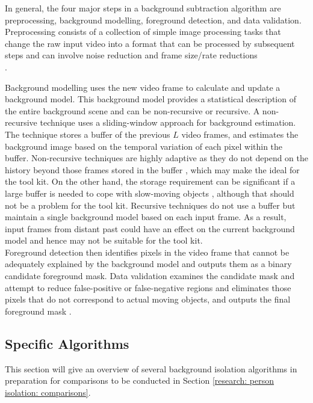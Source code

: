 In general, the four major steps in a background subtraction algorithm are preprocessing, background modelling, foreground detection, and data validation.
Preprocessing consists of a collection of simple image processing tasks that change the raw input video into a format that can be processed by subsequent steps and can involve noise reduction and frame size/rate reductions \cite{Cheung2007}\\.

Background modelling uses the new video frame to calculate and update a background model.
This background model provides a statistical description of the entire background scene and can be non-recursive or recursive. 
A non-recursive technique uses a sliding-window approach for background estimation. 
The technique stores a buffer of the previous $L$ video frames, and estimates the background image based on the temporal variation of each pixel within the buffer.
Non-recursive techniques are highly adaptive as they do not depend on the history beyond those frames stored in the buffer \cite{Cheung2007}, which may make the ideal for the tool kit.
On the other hand, the storage requirement can be significant if a large buffer
is needed to cope with slow-moving objects \cite{Cheung2007}, although that should not be a problem for the tool kit. Recursive techniques do not use a buffer but maintain a single background model based on each input frame. As a result, input frames from distant past could have an effect on the current background model \cite{Cheung2007} and hence may not be suitable for the tool kit.\\

Foreground detection then identifies pixels in the video frame that cannot be adequately explained by the background model and outputs them as a binary candidate foreground mask. 
Data validation examines the candidate mask and attempt to reduce false-positive or false-negative regions and eliminates those pixels that do not correspond to actual moving objects, and outputs the final foreground mask \cite{Cheung2007}.\\

\subsection{Specific Algorithms}
This section will give an overview of several background isolation algorithms in preparation for comparisons to be conducted in Section \ref{research: person isolation: comparisons}.\\

